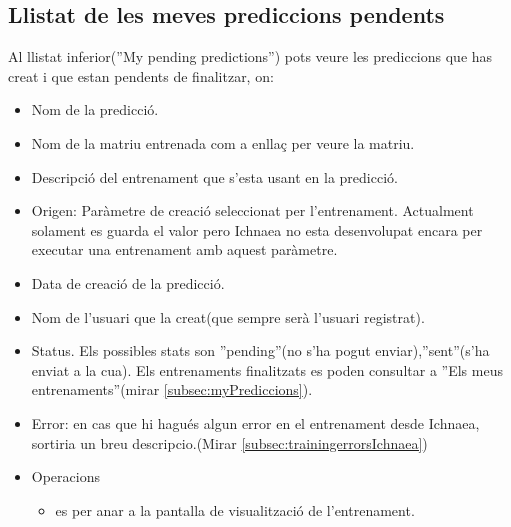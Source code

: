 \subsection{Llistat de les meves prediccions pendents}
Al llistat inferior(''My pending predictions'') pots veure les prediccions que has creat i que estan pendents de finalitzar, on: 
\begin{itemize}
\item Nom de la predicció.
\item Nom de la matriu entrenada com a enllaç per veure la matriu.
\item Descripci\'{o} del entrenament que s'esta usant en la predicció.
\item Origen: Paràmetre de creació seleccionat per l'entrenament. Actualment solament es guarda el valor pero Ichnaea no esta desenvolupat encara per executar una entrenament amb aquest paràmetre.
\item Data de creaci\'{o} de la predicció.
\item Nom de l'usuari que la creat(que sempre serà l'usuari registrat).
\item Status. Els possibles stats son ''pending''(no s'ha pogut enviar),''sent''(s'ha enviat a la cua). Els entrenaments finalitzats es poden consultar a ''Els meus entrenaments''(mirar \ref{subsec:myPrediccions}).
\item Error: en cas que hi hagués algun error en el entrenament desde Ichnaea, sortiria un breu descripcio.(Mirar \ref{subsec:trainingerrorsIchnaea})
\item Operacions
 \begin{itemize}
 \item \iconeyeopen es per anar a la pantalla de visualització de l'entrenament.
 \end{itemize}
\end{itemize}

